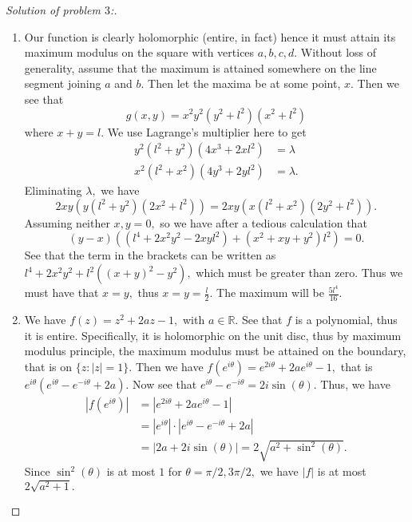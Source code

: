 \documentclass[letterpaper,11pt,twoside]{article}
\theoremstyle{proposition}
\theoremstyle{definition}
\theoremstyle{theorem}
\theoremstyle{definition}
\theoremstyle{definition}
\theoremstyle{definition}
\theoremstyle{lemma}
\theoremstyle{definition}
\theoremstyle{definition}
\theoremstyle{corollary}
\theoremstyle{definition}
\theoremstyle{definition}
\theoremstyle{definition}
\newcommand{\R}{\mathbb{R}}
\newcommand{\abs}[1]{\left \vert #1 \right \vert}
\begin{document}
	\begin{proof}[Solution of problem $3$:]
	\begin{enumerate}
		\item Our function is clearly holomorphic (entire, in fact) hence it must attain its maximum modulus on the square with vertices $a,b,c,d.$ Without 
		loss of generality, assume that the maximum is attained somewhere on the line segment joining $a$ and $b.$ Then let the maxima be at some point, 
		$x.$ Then we see that $$g(x,y) = x^2y^2 (y^2+l^2)(x^2+l^2)$$ where $x+y=l.$ We use Lagrange's multiplier here to get 
		\begin{align*}
			y^2(l^2+y^2)(4x^3 + 2x l^2) &= \lambda\\
			x^2(l^2+x^2)(4y^3 + 2y l^2) &= \lambda.
		\end{align*}
	Eliminating $\lambda,$ we have $$2xy (y(l^2+y^2)(2x^2+ l^2)) = 2xy (x(l^2+x^2)(2y^2+ l^2)).$$ Assuming neither $x,y =0,$ so we have after a tedious 
	calculation that   $$(y-x) \left( (l^4 + 2x^2y^2 -2xyl^2) + (x^2+xy+y^2)l^2 \right) =0.$$ See that the term in the brackets can be written as $l^4 + 
	2x^2y^2 + l^2 ((x+y)^2-y^2),$ which must be greater than zero. Thus we must have that $x=y,$ thus $x=y= \frac{l}{2}.$ The maximum will be 
	$\frac{5l^4}{16}.$ 
 		\item We have $f(z)= z^2 +2az -1,$ with $a \in \R.$ See that $f$ is a polynomial, thus it is entire. Specifically, it is holomorphic on the unit 
		disc, thus by maximum modulus principle, the maximum modulus must be attained on the boundary, that is on $\{z: \abs{z}=1\}. $
		Then we have $f(e^{i\theta})= e^{2i\theta}+2a e^{i \theta} -1,$ that is $ e^{i \theta}\left( e^{i\theta} - e^{-i\theta} +2a \right).$
		Now see that $e^{i\theta} - e^{-i\theta} = 2i \sin (\theta).$ Thus, we have 
		\begin{align*}
			\abs{f(e^{i\theta})}&= \abs{e^{2i\theta}+2a e^{i \theta} -1}\\
			&= \abs{e^{i \theta}} \cdot \abs{e^{i\theta} - e^{-i\theta} +2a}\\
			&= \abs{2a + 2i \sin (\theta)}= 2 \sqrt{a^2+\sin^2(\theta)}.
		\end{align*}
	Since $\sin^2(\theta)$ is at most $1$ for $\theta= \pi/2, 3 \pi/2,$ we have $|f|$ is at most $2 \sqrt{a^2+1}.$ 
	\end{enumerate}
	\end{proof}
\end{document}
